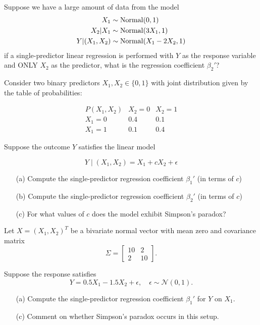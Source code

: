 \begin{exercise}[\ding{111}]
Suppose we have a large amount of data from the model 
\begin{align}
X_1 &\sim  {\rm Normal}(0,1)\\
X_2|X_1 &\sim {\rm Normal}(3X_1,1)\\
Y|(X_1,X_2) &\sim {\rm Normal}(X_1 -2 X_2,1)
\end{align}
if a single-predictor linear regression is performed with $Y$ as the response variable and ONLY $X_2$ as the predictor, what is the regression coefficient $\beta_2'$? 

\end{exercise}


\begin{exercise}[\ding{111}]
Consider two binary predictors \(X_1, X_2 \in \{0,1\}\) with joint distribution given by the table of probabilities:

\[
\begin{array}{c|cc}
P(X_1, X_2) & X_2=0 & X_2=1 \\ \hline
X_1=0 & 0.4 & 0.1 \\
X_1=1 & 0.1 & 0.4
\end{array}
\]

Suppose the outcome \(Y\) satisfies the linear model

\[
Y \mid (X_1, X_2) = X_1 + c X_2 + \epsilon 
\]


\begin{itemize}
\item[(a)] Compute the single-predictor regression coefficient $\beta_1'$ (in terms of $c$)
\item[(b)] Compute the single-predictor regression coefficient $\beta_2'$ (in terms of $c$)
\item[(c)] For what values of $c$ does the model exhibit Simpson's paradox? 
\end{itemize}
\end{exercise}


\begin{exercise}[\ding{111}]
Let \(X = (X_1, X_2)^T\) be a bivariate normal vector with mean zero and covariance matrix
\[
\Sigma = \begin{bmatrix} 10 & 2 \\ 2 & 10 \end{bmatrix}.
\]

Suppose the response satisfies
\[
Y = 0.5 X_1 - 1.5 X_2 + \epsilon, \quad \epsilon \sim \mathcal{N}(0,1).
\]

\begin{itemize}
\item[(a)] Compute the single-predictor regression coefficient \(\beta_1'\) for \(Y\) on \(X_1\).
\item[(c)] Comment on whether Simpson’s paradox occurs in this setup.
\end{itemize}
\end{exercise}


